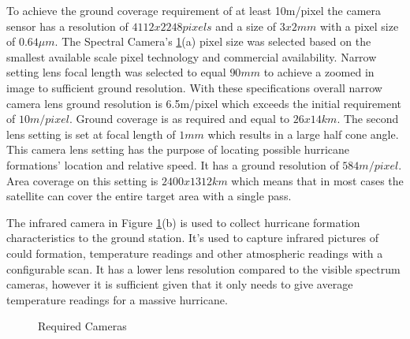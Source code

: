 To achieve the ground coverage requirement of at least 10m/pixel the camera sensor has a resolution of $4112x2248pixels$ and a size of $3x2mm$ with a pixel size of $0.64μm$. The Spectral Camera's \ref{fig:cameras}(a) pixel size was selected based on the smallest available scale pixel technology and commercial availability. Narrow setting lens focal length was selected to equal $90mm$ to achieve a zoomed in image to sufficient ground resolution. With these specifications overall narrow camera lens ground resolution is 6.5m/pixel which exceeds the initial requirement of $10m/pixel$. Ground coverage is as required and equal to $26x14km$. The second lens setting is set at focal length of $1mm$ which results in a large half cone angle. This camera lens setting has the purpose of locating possible hurricane formations' location and relative speed. It has a ground resolution of $584m/pixel$. Area coverage on this setting is $2400x1312km$ which means that in most cases the satellite can cover the entire target area with a single pass.

The infrared camera in Figure \ref{fig:cameras}(b) is used to collect hurricane formation characteristics to the ground station. It's used to capture infrared pictures of could formation, temperature readings and other atmospheric readings with a configurable scan. It has a lower lens resolution compared to the visible spectrum cameras, however it is sufficient given that it only needs to give average temperature readings for a massive hurricane.\\


\begin{figure}
    \centering
    \label{fig:sc}
    \qquad
    \label{fig:ic}
    \caption{Required Cameras}
    \label{fig:cameras}
\end{figure}


